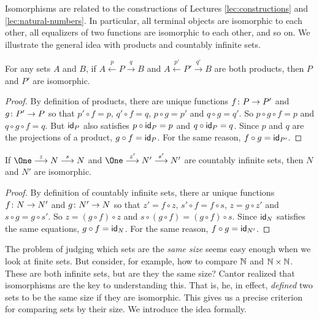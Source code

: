Isomorphisms are related to the constructions of Lectures \ref{lec:constructions} and \ref{lec:natural-numbers}. 
In particular, all terminal objects are isomorphic to each other, all equalizers of two functions are isomorphic to each other, and so on. 
We illustrate the general idea with products and countably infinite sets. 

\begin{lemma}
	For any sets $A$ and $B$, if $A\stackrel{p}{\longleftarrow}P\stackrel{q}{\longrightarrow}B$ and
	$A\stackrel{p'}{\longleftarrow}P'\stackrel{q'}{\longrightarrow}B$
	are both products, then $P$ and $P'$ are isomorphic.
	
	\begin{proof}
		By definition of products, there are unique functions ${f}\colon{P}\to{P'}$
		and ${g}\colon{P'}\to{P}$ so that $p'\circ f = p$, $q'\circ f=q$, 
		$p\circ g = p'$ and $q\circ g = q'$. So $p\circ g\circ f = p$
		and $q\circ g\circ f = q$. But $\textsf{id}_P$ also satisfies $p\circ \textsf{id}_P = p$
		and $q\circ \textsf{id}_P = q$. Since $p$ and $q$ are the projections of a product,
		$g\circ f = \textsf{id}_P$. For the same reason, $f\circ g = \textsf{id}_{P'}$.
	\end{proof}
\end{lemma}

\begin{lemma}
	If $\One\stackrel{z}{\longrightarrow}N\stackrel{s}{\longrightarrow}N$ and $\One\stackrel{z'}{\longrightarrow}N'\stackrel{s'}{\longrightarrow}N'$ are countably infinite sets, then $N$ and $N'$ are isomorphic. 
	
	\begin{proof}
		By definition of countably infinite sets, there ar unique functions ${f}\colon{N}\to{N'}$ and ${g}\colon{N'}\to{N}$ so that $z'= f\circ z$, $s'\circ f=f\circ s$, $z=g\circ z'$ and $s\circ g=g\circ s'$.
		So $z = (g\circ f)\circ z$ and $s\circ (g\circ f) = (g\circ f)\circ s$.
		Since $\textsf{id}_N$ satisfies the same equations, $g\circ f = \textsf{id}_N$. For the same reason, $f\circ g = \textsf{id}_{N'}$.
	\end{proof}
\end{lemma}

The problem of judging which sets are the \emph{same size} seems easy enough when we look at finite sets. But consider, for example, how to compare $\mathbb N$ and $\mathbb N\times \mathbb N$. These are both infinite sets, but are they the same size?
Cantor realized that isomorphisms are the key to understanding this. That is,
he, in effect, \emph{defined} two sets to be the same size if they are isomorphic.
This gives us a precise criterion for comparing sets by their size. We introduce the idea formally.

